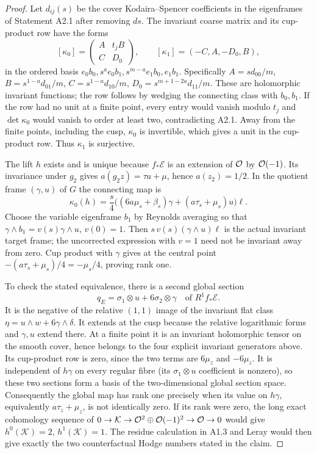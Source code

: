 \begin{proof}
Let $d_{ij}(s)$ be the cover Kodaira--Spencer coefficients in the
eigenframes of Statement A2.1 after removing $ds$.
The invariant coarse matrix and its cup-product row have the forms
\[
[\kappa_0]=\begin{pmatrix}A&t_jB\\C&D_0\end{pmatrix},\qquad
[\kappa_1]=(-C,A,-D_0,B),
\]
in the ordered basis
$e_0b_0,s^ae_0b_1,s^{m-a}e_1b_0,e_1b_1$.  Specifically
$A=sd_{00}/m$, $B=s^{1-a}d_{01}/m$,
$C=s^{1-a}d_{10}/m$, $D_0=s^{m+1-2a}d_{11}/m$.
These are holomorphic invariant functions; the row follows by
wedging the connecting class with $b_0,b_1$.
If the row had no unit at a finite point, every entry would vanish
modulo $t_j$ and $\det\kappa_0$ would vanish to order at least two,
contradicting A2.1.  Away from the finite points, including the cusp,
$\kappa_0$ is invertible, which gives a unit in the cup-product row.
Thus $\kappa_1$ is surjective.

The lift $h$ exists and is unique because $f_*\mathcal E$ is an
extension of $\mathcal O$ by $\mathcal O(-1)$.  Its invariance under $g_2$ gives
$a(g_2z)=\tau a+\mu$, hence $a(z_2)=1/2$.
In the quotient frame $(\gamma,u)$ of $G$ the connecting map is
\[
\kappa_0(h)=\frac{s}{4}
\bigl((6a\mu_s+\beta_s)\gamma+(a\tau_s+\mu_s)u\bigr)\ell.
\]
Choose the variable eigenframe $b_1$ by Reynolds averaging so that
$\gamma\wedge b_1=v(s)\gamma\wedge u$, $v(0)=1$.
Then $s\,v(s)(\gamma\wedge u)\ell$ is the actual invariant
target frame; the uncorrected expression with $v=1$ need not be
invariant away from zero.  Cup product with $\gamma$ gives at the
central point $-(a\tau_s+\mu_s)/4=-\mu_s/4$, proving rank one.

To check the stated equivalence, there is a second global section
\[
q_E=\sigma_1\otimes u+6\sigma_2\otimes\gamma
\quad\text{of }R^1f_*\mathcal E.
\]
It is the negative of the relative $(1,1)$ image of the invariant
flat class $\eta=u\wedge w+6\gamma\wedge\delta$.
It extends at the cusp because the relative logarithmic forms and
$\gamma,u$ extend there.  At a finite point it is an invariant
holomorphic tensor on the smooth cover, hence belongs to the four
explicit invariant generators above.  Its cup-product row is zero,
since the two terms are $6\mu_z$ and $-6\mu_z$.
It is independent of $h\gamma$ on every regular fibre (its
$\sigma_1\otimes u$ coefficient is nonzero), so these two sections
form a basis of the two-dimensional global section space.
Consequently the global map has rank one precisely when its value
on $h\gamma$, equivalently $a\tau_z+\mu_z$, is not identically
zero.  If its rank were zero, the long exact cohomology sequence of
$0\to\mathcal K\to\mathcal O^2\oplus\mathcal O(-1)^2\to\mathcal O\to0$
would give $h^0(\mathcal K)=2$, $h^1(\mathcal K)=1$.
The residue calculation in A1.3 and Leray would then give exactly
the two counterfactual Hodge numbers stated in the claim.
\end{proof}

